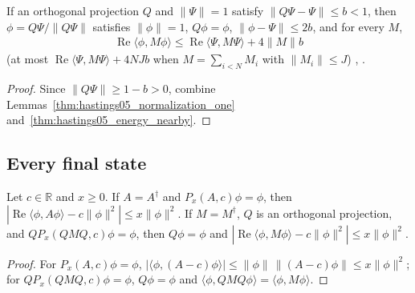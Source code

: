 \begin{lemma}
    \label{thm:hastings05_hchy}
    \leanok
    If an orthogonal projection $Q$ and $\|\Psi\|=1$ satisfy
    $\|Q\Psi-\Psi\|\le b<1$, then $\phi=Q\Psi/\|Q\Psi\|$ satisfies $\|\phi\|=1$,
    $Q\phi=\phi$, $\|\phi-\Psi\|\le2b$, and for every $M$,
    \begin{align}
        \operatorname{Re}\langle\phi,M\phi\rangle
        \le\operatorname{Re}\langle\Psi,M\Psi\rangle+4\|M\|b
        \label{eq:hastings05_hchy}
    \end{align}
    (at most $\operatorname{Re}\langle\Psi,M\Psi\rangle+4NJb$ when
    $M=\sum_{i<N}M_i$ with $\|M_i\|\le J$)
    \cite[eq.~(hchy), lines 709--720]{Hastings2006Solving},
    \cite{gap:hastings05_hierarchical_energy}.
\end{lemma}
\begin{proof}
    \leanok
    Since $\|Q\Psi\|\ge1-b>0$, combine
    Lemmas~\ref{thm:hastings05_normalization_one}
    and~\ref{thm:hastings05_energy_nearby}.
\end{proof}

\subsection*{Every final state}

\begin{lemma}
    \label{thm:hastings05_window_expectation}
    \leanok
    Let $c\in\mathbb R$ and $x\ge0$. If $A=A^\dagger$ and
    $P_x(A,c)\phi=\phi$, then
    $|\operatorname{Re}\langle\phi,A\phi\rangle-c\|\phi\|^2|\le x\|\phi\|^2$.
    If $M=M^\dagger$, $Q$ is an orthogonal projection, and
    $QP_x(QMQ,c)\phi=\phi$, then $Q\phi=\phi$ and
    $|\operatorname{Re}\langle\phi,M\phi\rangle-c\|\phi\|^2|\le x\|\phi\|^2$.
\end{lemma}
\begin{proof}\leanok
    For $P_x(A,c)\phi=\phi$,
    $|\langle\phi,(A-c)\phi\rangle|\le\|\phi\|\,\|(A-c)\phi\|\le x\|\phi\|^2$;
    for $QP_x(QMQ,c)\phi=\phi$, $Q\phi=\phi$ and
    $\langle\phi,QMQ\phi\rangle=\langle\phi,M\phi\rangle$.
\end{proof}


